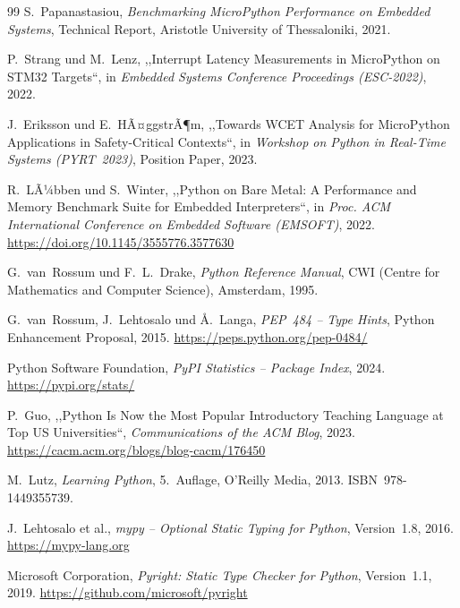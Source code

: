 ﻿\documentclass[12pt,a4paper,twoside]{article}
\newcommand{\doi}[1]{\url{https://doi.org/#1}}
\begin{document}
\begin{thebibliography}{99}
  S.~Papanastasiou,
  \textit{Benchmarking MicroPython Performance on Embedded Systems},
  Technical Report, Aristotle University of Thessaloniki, 2021.

  P.~Strang und M.~Lenz,
  ,,Interrupt Latency Measurements in MicroPython on STM32 Targets``,
  in \textit{Embedded Systems Conference Proceedings (ESC-2022)}, 2022.

  J.~Eriksson und E.~HÃ¤ggstrÃ¶m,
  ,,Towards WCET Analysis for MicroPython Applications in Safety-Critical Contexts``,
  in \textit{Workshop on Python in Real-Time Systems (PYRT~2023)},
  Position Paper, 2023.

  R.~LÃ¼bben und S.~Winter,
  ,,Python on Bare Metal: A Performance and Memory Benchmark Suite
  for Embedded Interpreters``,
  in \textit{Proc. ACM International Conference on Embedded Software (EMSOFT)}, 2022.
  \doi{10.1145/3555776.3577630}

  G.~van~Rossum und F.~L.~Drake,
  \textit{Python Reference Manual},
  CWI (Centre for Mathematics and Computer Science),
  Amsterdam, 1995.

  G.~van~Rossum, J.~Lehtosalo und Å.~Langa,
  \textit{PEP~484 -- Type Hints},
  Python Enhancement Proposal, 2015.
  \url{https://peps.python.org/pep-0484/}

  {Python Software Foundation},
  \textit{PyPI Statistics -- Package Index}, 2024.
  \url{https://pypi.org/stats/}

  P.~Guo,
  ,,Python Is Now the Most Popular Introductory Teaching Language
  at Top US Universities``,
  \textit{Communications of the ACM Blog}, 2023.
  \url{https://cacm.acm.org/blogs/blog-cacm/176450}

  M.~Lutz,
  \textit{Learning Python},
  5.~Auflage, O'Reilly Media, 2013.
  ISBN~978-1449355739.


  J.~Lehtosalo et al.,
  \textit{mypy -- Optional Static Typing for Python},
  Version~1.8, 2016.
  \url{https://mypy-lang.org}

  {Microsoft Corporation},
  \textit{Pyright: Static Type Checker for Python},
  Version~1.1, 2019.
  \url{https://github.com/microsoft/pyright}


\end{thebibliography}
\end{document}
